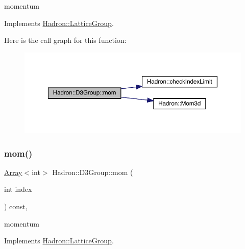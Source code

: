 momentum 

Implements \mbox{\hyperlink{structHadron_1_1LatticeGroup_ad577b65041dd9a6e84b1f3bd49cb8fce}{Hadron\+::\+Lattice\+Group}}.

Here is the call graph for this function\+:
\nopagebreak
\begin{figure}[H]
\begin{center}
\leavevmode
\includegraphics[width=350pt]{de/de1/structHadron_1_1D3Group_a5662028a7fb3554c893609148e6d3eeb_cgraph}
\end{center}
\end{figure}
\mbox{\label{structHadron_1_1D3Group_a5662028a7fb3554c893609148e6d3eeb}} 
\subsubsection{\texorpdfstring{mom()}{mom()}\hspace{0.1cm}{\footnotesize\ttfamily [3/3]}}
{\footnotesize\ttfamily \mbox{\hyperlink{classXMLArray_1_1Array}{Array}}$<$int$>$ Hadron\+::\+D3\+Group\+::mom (\begin{DoxyParamCaption}\item[{int}]{index }\end{DoxyParamCaption}) const\hspace{0.3cm}{\ttfamily [inline]}, {\ttfamily [virtual]}}

momentum 

Implements \mbox{\hyperlink{structHadron_1_1LatticeGroup_ad577b65041dd9a6e84b1f3bd49cb8fce}{Hadron\+::\+Lattice\+Group}}.

